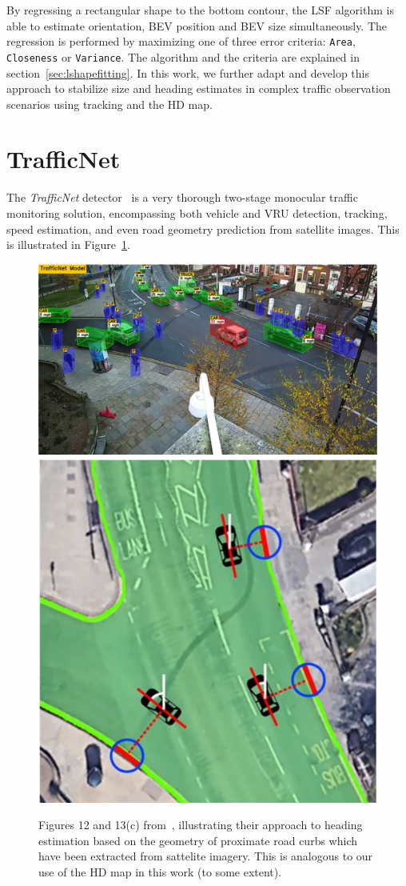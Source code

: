 By regressing a rectangular shape to the bottom contour, the LSF algorithm is able to estimate orientation, BEV position and BEV size simultaneously.
The regression is performed by maximizing one of three error criteria: \texttt{Area}, \texttt{Closeness} or \texttt{Variance}.
The algorithm and the criteria are explained in section~\ref{sec:lshapefitting}.
In this work, we further adapt and develop this approach to stabilize size and heading estimates in complex traffic observation scenarios using tracking and the HD map.

\section{TrafficNet}
\label{sec:related-trafficnet}

The \textit{TrafficNet} detector~\cite{rezaei2021traffic} is a very thorough two-stage monocular traffic monitoring solution, encompassing both vehicle and VRU detection, tracking, speed estimation, and even road geometry prediction from satellite images.
This is illustrated in Figure~\ref{fig:related-tranet}.

\begin{figure}[htb]
    \centering
    \includegraphics[width=0.63\linewidth]{figures/tranet}
    \includegraphics[width=0.35\linewidth]{figures/tranet-angle-estimation}
    \caption{Figures 12 and 13(c) from~\cite{rezaei2021traffic}, illustrating their approach to heading estimation based on the geometry of proximate road curbs which have been extracted from sattelite imagery. This is analogous to our use of the HD map in this work (to some extent).}
    \label{fig:related-tranet}
\end{figure}

